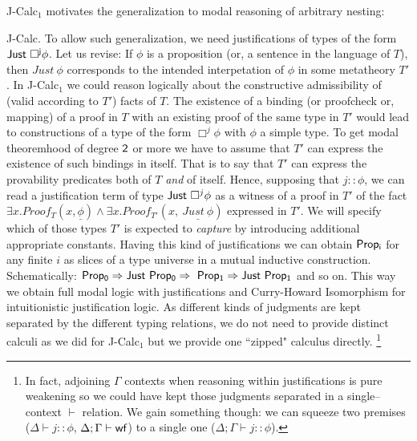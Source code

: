\documentclass[11pt]{eptcs} %
\begin{document}
{\sf J-Calc$_1$} motivates the generalization to modal reasoning of arbitrary nesting: {{\sf J-Calc}. To allow such generalization, we need justifications of types of the form ${\sf Just\  \Box^{j}\phi}$. Let us revise: If $\phi$ is a proposition (or, a sentence in the language of $T$), then $Just\ \phi$ corresponds to the intended interpetation of $\phi$ in some metatheory $T'$. In {\sf J-Calc$_1$} we could reason logically about the constructive admissibility of (valid according to $T'$) facts of $T$. The existence of a binding (or proofcheck or, mapping) of a proof in $T$ with an existing proof of the same type in $T'$ would lead to constructions of a type of the form $\Box^{j}\phi$ with $\phi$ a simple type. To get modal theoremhood of degree ${\sf 2}$ or more we have to assume that $T'$ can express the existence of such bindings in itself. That is to say that $T'$ can express the provability predicates both of $T$ \textit{and} of itself. Hence, supposing that $j::\phi$, we can read a justification term of type ${{\sf Just}\  \Box^{j}\phi}$ as a witness of a proof in $T'$ of the fact $\exists x. Proof_T(x, \underline{\phi}) \wedge \exists x. Proof_{T'}(x, \  \underline{Just\  \phi}) $ expressed in $T'$. 
We will specify which of those types $T'$ is expected to \textit{capture} by introducing additional appropriate constants. Having this kind of justifications we can obtain ${\sf Prop_i}$ for any finite $i$ as slices of a type universe in a mutual inductive construction. Schematically: $ {\sf Prop_0\Rightarrow Just \ Prop_0\Rightarrow \ Prop_1 \Rightarrow Just\ Prop_1}$ and so on. This way we obtain full modal logic with justifications and Curry-Howard Isomorphism for intuitionistic justification logic. As different kinds of judgments are kept separated by the different typing relations, we do not need to provide distinct calculi as we did for {\sf J-Calc$_1$} but we provide one ``zipped" calculus directly. \footnote {In fact, adjoining $\Gamma$ contexts when reasoning within justifications is pure weakening so we could have kept those judgments separated in a single--context $\vdash$ relation. We gain something though: we can squeeze two premises ($\Delta\vdash j::\phi$, $\Delta;\Gamma\vdash{\sf wf}$) to a single one ($\Delta;\Gamma\vdash j::\phi$).}

}
\end{document}
